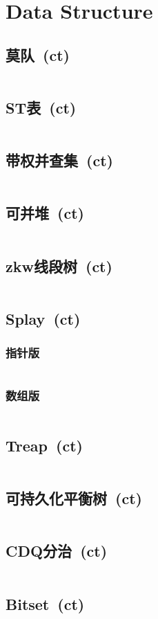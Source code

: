 \chapter{Data Structure}
\section{莫队\ \small(ct)}
	\inputminted{cpp}{DataStructure/mo_dui.cpp}
\section{ST表\ \small(ct)}
	\inputminted{cpp}{DataStructure/st_table.cpp}
\section{带权并查集\ \small(ct)}
	\inputminted{cpp}{DataStructure/union_find_weighted.cpp}
\section{可并堆\ \small(ct)}
	\inputminted{cpp}{DataStructure/mergeable_heap.cpp}
\section{zkw线段树\ \small(ct)}
	\inputminted{cpp}{DataStructure/zkw_segment_tree.cpp}
\section{Splay\ \small(ct)}
	\subsection*{指针版}
		\inputminted{cpp}{DataStructure/splay.cpp}
	\subsection*{数组版}
		\inputminted{cpp}{DataStructure/splay_arr.cpp}
\section{Treap\ \small(ct)}
	\inputminted{cpp}{DataStructure/treap.cpp}
\section{可持久化平衡树\ \small(ct)}
	\inputminted{cpp}{DataStructure/functional_treap.cpp}
\section{CDQ分治\ \small(ct)}
	\inputminted{cpp}{DataStructure/cdq_divide.cpp}
\section{Bitset\ \small(ct)}
	\inputminted{cpp}{DataStructure/bitset.cpp}